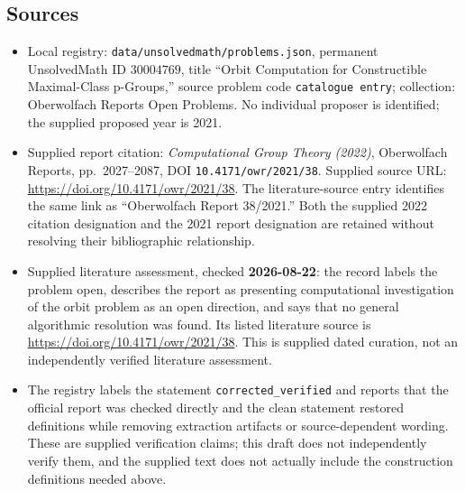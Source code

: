 \documentclass[11pt]{article}
\begin{document}
\subsection{Sources}
\begin{itemize}
\item Local registry: \texttt{data/unsolvedmath/problems.json}, permanent UnsolvedMath ID \(30004769\), title ``Orbit Computation for Constructible Maximal-Class p-Groups,'' source problem code \texttt{catalogue entry}; collection: Oberwolfach Reports Open Problems. No individual proposer is identified; the supplied proposed year is 2021.
\item Supplied report citation: \emph{Computational Group Theory (2022)}, Oberwolfach Reports, pp.\ 2027--2087, DOI \texttt{10.4171/owr/2021/38}. Supplied source URL: \url{https://doi.org/10.4171/owr/2021/38}. The literature-source entry identifies the same link as ``Oberwolfach Report 38/2021.'' Both the supplied 2022 citation designation and the 2021 report designation are retained without resolving their bibliographic relationship.
\item Supplied literature assessment, checked \textbf{2026-08-22}: the record labels the problem open, describes the report as presenting computational investigation of the orbit problem as an open direction, and says that no general algorithmic resolution was found. Its listed literature source is \url{https://doi.org/10.4171/owr/2021/38}. This is supplied dated curation, not an independently verified literature assessment.
\item The registry labels the statement \texttt{corrected\_verified} and reports that the official report was checked directly and the clean statement restored definitions while removing extraction artifacts or source-dependent wording. These are supplied verification claims; this draft does not independently verify them, and the supplied text does not actually include the construction definitions needed above.
\end{itemize}
\end{document}
